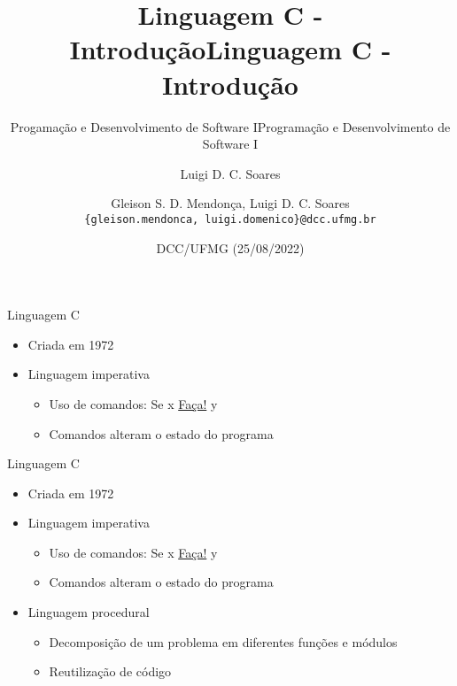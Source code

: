 \documentclass[t, aspectratio=169]{beamer}
\author{Luigi D. C. Soares}
\date{DCC/UFMG (25/08/2022)}
\title{Linguagem C - Introdução}
\subtitle{Progamação e Desenvolvimento de Software I}
\title[Linguagem C]{Linguagem C - Introdução}
\subtitle{Programação e Desenvolvimento de Software I}
\author[\tiny\{gleison.mendonca, luigi.domenico\}@dcc.ufmg.br]{%
Gleison S. D. Mendonça, Luigi D. C. Soares\texorpdfstring{\\}{}
\texttt{\{gleison.mendonca, luigi.domenico\}@dcc.ufmg.br}}
\institute[DCC/UFMG]{}
\date[25/08/2022]{}
\begin{document}
\maketitle

\begin{frame}[label={sec:orgaa5a543}]{Linguagem C}
\begin{itemize}
\item Criada em 1972

\item Linguagem imperativa
\begin{itemize}
\item Uso de comandos: Se \alert{x} \uline{Faça!} \alert{y}
\item Comandos alteram o estado do programa
\end{itemize}
\end{itemize}
\end{frame}

\begin{frame}[label={sec:orga43e3dd}]{Linguagem C}
\begin{itemize}
\item Criada em 1972

\item Linguagem imperativa
\begin{itemize}
\item Uso de comandos: Se \alert{x} \uline{Faça!} \alert{y}
\item Comandos alteram o estado do programa
\end{itemize}

\item Linguagem procedural
\begin{itemize}
\item Decomposição de um problema em diferentes funções e módulos
\item Reutilização de código
\end{itemize}
\end{itemize}
\end{frame}
\end{document}
